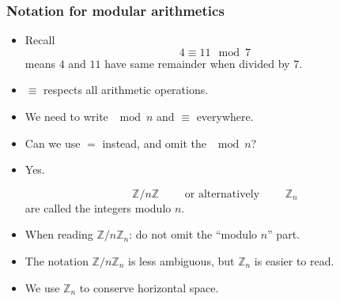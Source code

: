 \begin{frame}
\frametitle{Notation for modular arithmetics}
\begin{itemize}
\item Recall
\[
4\equiv 11 \mod 7
\]
means $4$ and $11$ have same remainder when divided by $7$.
\item $\equiv$ respects all arithmetic operations.
\item We need to write $\mod n$ and $\equiv$ everywhere.
\item Can we use $=$ instead, and omit the $\mod n$?
\item Yes. 
\begin{definition}
\[
\mathbb Z/n\mathbb Z \qquad \text{ or alternatively } \qquad \mathbb Z_n
\]
are called the integers modulo $n$.
\end{definition}
\item When reading $\mathbb Z/n\mathbb Z_n$: do not omit the ``modulo $n$'' part.
\item The notation $\mathbb Z/n\mathbb Z_n$ is less ambiguous, but $\mathbb Z_n$ is easier to read.
\item We use $\mathbb Z_n$ to conserve horizontal space. 
\end{itemize}

\end{frame}